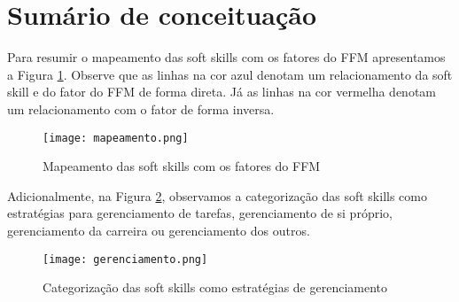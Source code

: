\section{Sumário de conceituação}

Para resumir o mapeamento das soft skills com os fatores do FFM apresentamos a Figura \ref{fig:mapeamento}. Observe que as linhas na cor azul denotam um relacionamento da soft skill e do fator do FFM de forma direta. Já as linhas na cor vermelha denotam um relacionamento com o fator de forma inversa.

\begin{figure}[h*]
\centering
\caption{\small Mapeamento das soft skills com os fatores do FFM} 
\texttt{[image: mapeamento.png]}
\label{fig:mapeamento}
\end{figure}

Adicionalmente, na Figura \ref{fig:gerenciamento}, observamos a categorização das soft skills como estratégias para gerenciamento de tarefas, gerenciamento de si próprio, gerenciamento da carreira ou gerenciamento dos outros.

\begin{figure}[h*]
\centering
\caption{\small Categorização das soft skills como estratégias de gerenciamento} %
\texttt{[image: gerenciamento.png]}
\label{fig:gerenciamento}
\end{figure}